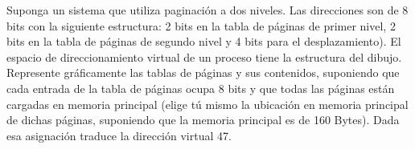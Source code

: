 \begin{ejercicio}
    Suponga un sistema que utiliza paginación a dos niveles. Las direcciones son de 8 bits
con la siguiente estructura: 2 bits en la tabla de páginas de primer nivel, 2 bits en la tabla
de páginas de segundo nivel y 4 bits para el desplazamiento). El espacio de
direccionamiento virtual de un proceso tiene la estructura del dibujo. Represente
gráficamente las tablas de páginas y sus contenidos, suponiendo que cada entrada de la
tabla de páginas ocupa 8 bits y que todas las páginas están cargadas en memoria
principal (elige tú mismo la ubicación en memoria principal de dichas páginas,
suponiendo que la memoria principal es de 160 Bytes). Dada esa asignación traduce la
dirección virtual 47.
\begin{figure}[H]
    \centering
\end{figure}
\end{ejercicio}


